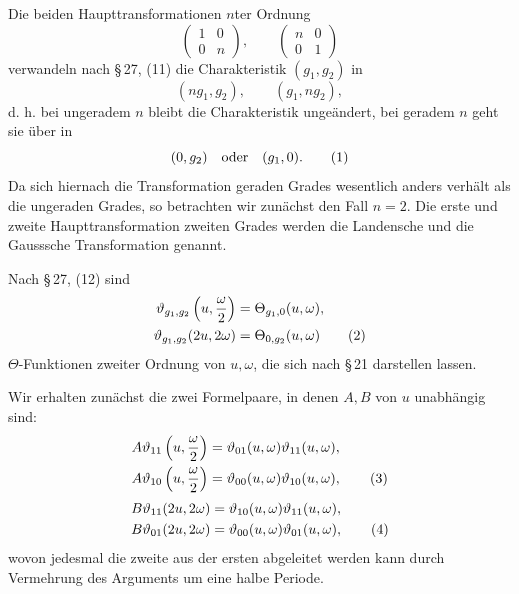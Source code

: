 \documentclass[11pt]{article}
\providecommand{\tht}{\vartheta}
\begin{document}
Die beiden Haupttransformationen $n$ter Ordnung
\[
\begin{pmatrix}1&0\\0&n\end{pmatrix},
\qquad
\begin{pmatrix}n&0\\0&1\end{pmatrix}
\]
verwandeln nach \S\,27, (11) die Charakteristik $(g_1,g_2)$ in
\[
(ng_1,g_2),\qquad (g_1,ng_2),
\]
d. h. bei ungeradem $n$ bleibt die Charakteristik ungeändert, bei geradem $n$ geht sie über in
\begin{equation}
(0,g_2)\quad\hbox{oder}\quad(g_1,0). \tag{1}
\end{equation}
Da sich hiernach die Transformation geraden Grades wesentlich anders verhält als die ungeraden Grades, so betrachten wir zunächst den Fall $n=2$. Die erste und zweite Haupttransformation zweiten Grades werden die Landensche und die Gausssche Transformation genannt.

Nach \S\,27, (12) sind
\begin{align}
\tht_{g_1,g_2}\left(u,{\omega\over2}\right)&=\Theta_{g_1,0}(u,\omega),\notag\\
\tht_{g_1,g_2}(2u,2\omega)&=\Theta_{0,g_2}(u,\omega) \tag{2}
\end{align}
$\Theta$-Funktionen zweiter Ordnung von $u,\omega$, die sich nach \S\,21 darstellen lassen.

Wir erhalten zunächst die zwei Formelpaare, in denen $A,B$ von $u$ unabhängig sind:
\begin{align}
A\tht_{11}\left(u,{\omega\over2}\right)&=\tht_{01}(u,\omega)\tht_{11}(u,\omega),\notag\\
A\tht_{10}\left(u,{\omega\over2}\right)&=\tht_{00}(u,\omega)\tht_{10}(u,\omega), \tag{3}
\end{align}
\begin{align}
B\tht_{11}(2u,2\omega)&=\tht_{10}(u,\omega)\tht_{11}(u,\omega),\notag\\
B\tht_{01}(2u,2\omega)&=\tht_{00}(u,\omega)\tht_{01}(u,\omega), \tag{4}
\end{align}
wovon jedesmal die zweite aus der ersten abgeleitet werden kann durch Vermehrung des Arguments um eine halbe Periode.
\end{document}
